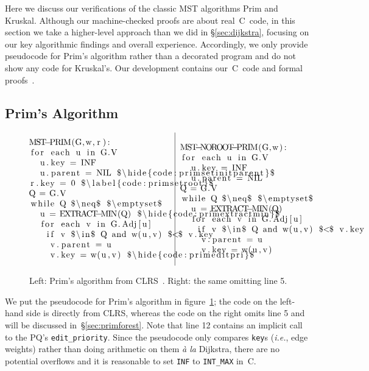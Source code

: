 Here we discuss our verifications of the classic MST algorithms Prim and Kruskal.  Although our machine-checked proofs are about real~C~code, in this section we take a higher-level approach than we did in \S\ref{sec:dijkstra}, focusing on our key algorithmic findings and overall experience.  Accordingly, we only provide pseudocode for Prim's algorithm rather than a decorated program and do not show any code for Kruskal's.  Our development contains our~C~code and formal proofs~\cite{mohan_anshuman_2021_4744665}.

\vspace*{-0.5em}
\subsection{Prim's Algorithm}
\label{sec:prim}

\vspace*{-0.25em}

\begin{figure}[t]
\[
\begin{array}{@{}l@{~~}|@{~~}l@{}}
\begin{minipage}{0.475\textwidth}
\begin{lstlisting}
MST-PRIM(G,w,r):
 for each u in G.V
  u.key = INF
  u.parent = NIL $\hide{code:primsetinitparent}$
 r.key = 0 $\label{code:primsetroot}$
 Q = G.V
 while Q $\neq$ $\emptyset$
  u = EXTRACT-MIN(Q) $\hide{code:primextractmin}$
  for each v in G.Adj[u]
   if v $\in$ Q and w(u,v) $<$ v.key
    v.parent = u
    v.key = w(u,v) $\hide{code:primeditpri}$
\end{lstlisting} \end{minipage} &
\begin{minipage}{0.5\textwidth}
\begin{lstlisting}[numbers=none]
MST-NOROOT-PRIM(G,w):
 for each u in G.V
  u.key = INF
  u.parent = NIL

 Q = G.V
 while Q $\neq$ $\emptyset$
  u = EXTRACT-MIN(Q)
  for each v in G.Adj[u]
   if v $\in$ Q and w(u,v) $<$ v.key
    v.parent = u
    v.key = w(u,v)
\end{lstlisting}
\end{minipage}
\end{array}
\]
\vspace*{-0.75em}
\caption{Left: Prim's algorithm from CLRS~\cite{clrs}. Right: the same omitting line 5.}
\vspace*{-1.0em}
\label{fig:prims}
\end{figure}

We put the pseudocode for Prim's algorithm in figure~\ref{fig:prims}; the code on the left-hand side is directly from CLRS, whereas the code on the right omits line 5 and will be discussed in~\S\ref{sec:primforest}.  Note that line 12 contains an implicit call to the PQ's \texttt{edit\_priority}.  Since the pseudocode only compares \texttt{key}s (\emph{i.e.}, edge weights) rather than doing arithmetic on them \emph{\`a la} Dijkstra, there are no potential overflows and it is reasonable to set \texttt{INF} to \texttt{INT\_MAX} in~C.

